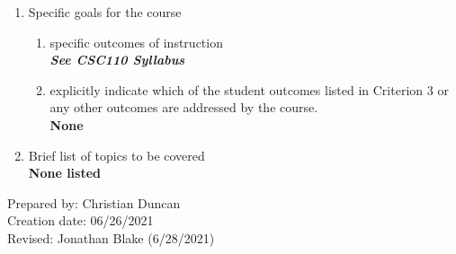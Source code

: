 \begin{enumerate}[1.]
\begin{enumerate}[a.]
\end{enumerate}

\item Specific goals for the course
\begin{enumerate}
\item specific outcomes of instruction\\ %
  {\bfseries
    \emph{See CSC110 Syllabus}
  }

\item explicitly indicate which of the student outcomes listed in Criterion 3 or any other outcomes are addressed by the course.\\
  {\bfseries
    None
  }
\end{enumerate}

\item Brief list of topics to be covered\\
  {\bfseries
  None listed
  }

\end{enumerate}

\noindent Prepared by: Christian Duncan\\
\noindent Creation date: 06/26/2021\\
\noindent Revised: Jonathan Blake (6/28/2021)\\
